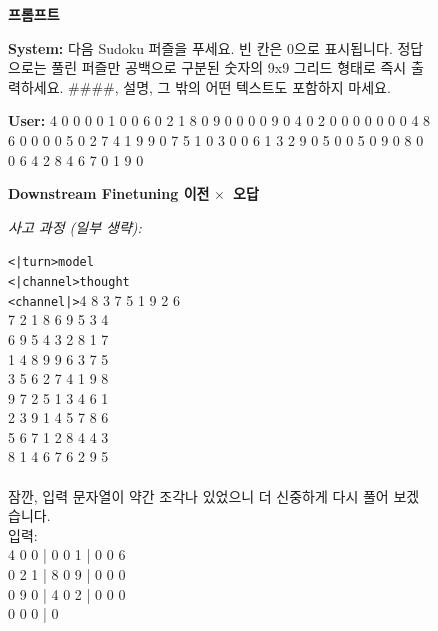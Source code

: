 \begin{figure}[htbp]
\scriptsize
\begin{mdframed}[style=promptbox]
\noindent\textbf{프롬프트}

\vspace{2pt}\noindent
\textbf{System:} 다음 Sudoku 퍼즐을 푸세요. 빈 칸은 0으로 표시됩니다. 정답으로는 풀린 퍼즐만 공백으로 구분된 숫자의 9x9 그리드 형태로 즉시 출력하세요. \#\#\#\#, 설명, 그 밖의 어떤 텍스트도 포함하지 마세요.

\vspace{4pt}\noindent
\textbf{User:} 4 0 0 0 0 1 0 0 6 0 2 1 8 0 9 0 0 0 0 9 0 4 0 2 0 0 0 0 0 0 0 4 8 6 0 0 0 0 5 0 2 7 4 1 9 9 0 7 5 1 0 3 0 0 6 1 3 2 9 0 5 0 0 5 0 9 0 8 0 0 6 4 2 8 4 6 7 0 1 9 0
\end{mdframed}
\vspace{2pt}
\noindent
\begin{minipage}[t]{0.49\textwidth}
\begin{mdframed}[style=beforebox]
\noindent\textbf{Downstream Finetuning 이전} \hfill {\colorbox{beforebg}{\textcolor{beforeframe}{\textbf{$\boldsymbol\times$~오답 }}}}

\noindent\textit{사고 과정 (일부 생략):}
\begin{mdframed}[style=thinkbox]
\texttt{<|turn>model} \\
\texttt{<|channel>thought} \\
\texttt{<channel|>}4 8 3 7 5 1 9 2 6 \\
7 2 1 8 6 9 5 3 4 \\
6 9 5 4 3 2 8 1 7 \\
1 4 8 9 9 6 3 7 5 \\
3 5 6 2 7 4 1 9 8 \\
9 7 2 5 1 3 4 6 1 \\
2 3 9 1 4 5 7 8 6 \\
5 6 7 1 2 8 4 4 3 \\
8 1 4 6 7 6 2 9 5 \\
\\
잠깐, 입력 문자열이 약간 조각나 있었으니 더 신중하게 다시 풀어 보겠습니다. \\
입력: \\
4 0 0 | 0 0 1 | 0 0 6 \\
0 2 1 | 8 0 9 | 0 0 0 \\
0 9 0 | 4 0 2 | 0 0 0 \\
0 0 0 | 0


\end{mdframed}
\end{mdframed}
\end{minipage}
\end{figure}
